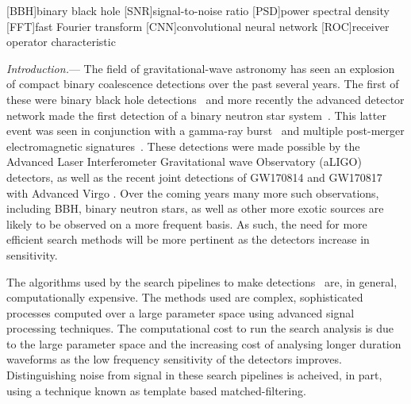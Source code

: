 \documentclass[%
showpacs,
 amsmath,amssymb,
 aps,
 twocolumn,
 prl,
 reprint,
floatfix,
]{revtex4-1}
\begin{document}
\maketitle

[BBH]{binary black hole}
[SNR]{signal-to-noise ratio}
[PSD]{power spectral density}
[FFT]{fast Fourier transform}
[CNN]{convolutional neural network}
[ROC]{receiver operator characteristic}


%
%

%
%
\textit{Introduction.}--- 
%
%
The field of gravitational-wave astronomy has seen an explosion of compact
binary coalescence detections over the past several years. The first of these
were binary black hole detections~\cite{PhysRevLett.116.061102,
PhysRevLett.116.241103, PhysRevLett.118.221101} and more recently the advanced
detector network made the first detection of a binary neutron star
system~\cite{PhysRevLett.119.161101}. This latter event was seen in conjunction
with a gamma-ray
burst~\cite{2017arXiv171005834L,2017arXiv171005446G,2017arXiv171005449S} and
multiple post-merger electromagnetic signatures~\cite{2017arXiv171005833L}.
These detections were made possible by the Advanced Laser Interferometer
Gravitational wave Observatory (aLIGO) detectors, as well as the recent joint
detections of GW170814 and GW170817 with Advanced Virgo
\cite{PhysRevLett.119.141101,PhysRevLett.119.161101}. Over the coming years
many more such observations, including \ac{BBH}, binary neutron stars, as well
as other more exotic sources are likely to be observed on a more frequent basis. As
such, the need for more efficient search methods will be more pertinent as the
detectors increase in sensitivity.

%
%
The algorithms used by the search pipelines to make
detections~\cite{0264-9381-33-21-215004, 0004-637X-748-2-136,
PhysRevD.90.082004} are, in general, computationally expensive. The methods
used are complex, sophisticated processes computed over a large parameter space
using advanced signal processing techniques. The computational cost to run the
search analysis is due to the large parameter space and the increasing cost of
analysing longer duration waveforms as the low frequency sensitivity of the
detectors improves. Distinguishing noise from signal in these search pipelines
is acheived, in part, using a technique known as template based matched-filtering. 
\end{document}
